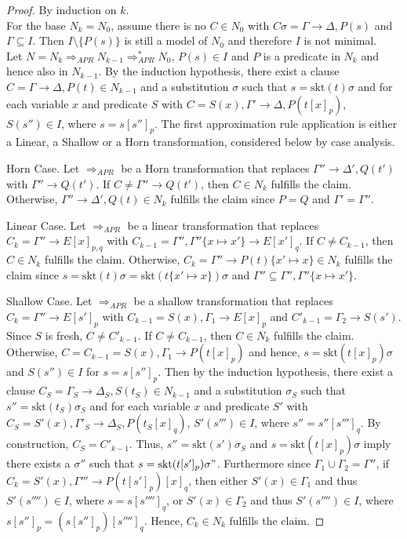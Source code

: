\documentclass{llncs}
\newcommand{\imp}{\rightarrow}
\newcommand{\skt}{\text{skt}}
\newcommand{\apr}{ \Rightarrow_{APR}}
\begin{document}
\begin{proof}
By induction on $k$.\\
For the base $N_k=N_0$, assume there is no $C \in N_0$ with $C\sigma= \Gamma \imp \Delta,P(s)$ and $\Gamma \subseteq I$.
Then $I\setminus \{P(s)\}$ is still a model of $N_0$ and therefore $I$ is not minimal.\\
Let  $N = N_k\apr N_{k-1} \apr^* N_0$, $P(s) \in  I$ and $P$ is a predicate in $N_k$ and hence also in $N_{k-1}$. 
By the induction hypothesis, there exist a clause $C = \Gamma \imp \Delta,P(t) \in N_{k-1}$ and a substitution $\sigma$ such that
$s = \skt(t)\sigma$ and for each variable $x$ and predicate $S$ with $C = S(x),\Gamma' \imp \Delta,P(t[x]_p)$, $S(s'') \in I$, where $s=s[s'']_p$.
The first approximation rule application is either a Linear, a Shallow or a Horn transformation,
considered below by case analysis.

Horn Case. Let $\apr$ be a Horn transformation that replaces $\Gamma'' \imp \Delta',Q(t')$ with $\Gamma'' \imp Q(t')$.
If $C \neq \Gamma'' \imp Q(t')$, then $C \in N_k$ fulfills the claim.
Otherwise, $\Gamma'' \imp \Delta',Q(t) \in N_k$ fulfills the claim since $P=Q$ and $\Gamma' = \Gamma''$.

Linear Case. Let $\apr$ be a linear transformation that replaces $C_k = \Gamma'' \imp E[x]_{p,q}$ with $C_{k-1}=\Gamma'',\Gamma''\{x \mapsto x'\} \imp E[x']_{q}$.
If $C \neq C_{k-1}$, then $C \in N_k$ fulfills the claim.
Otherwise, $C_k=\Gamma'' \imp P(t)\{x' \mapsto x\} \in N_k$ fulfills the claim since $s = \skt(t)\sigma = \skt(t\{x' \mapsto x\})\sigma$ and $\Gamma'' \subseteq \Gamma'',\Gamma''\{x \mapsto x'\}$.

Shallow Case. Let $\apr$ be a shallow transformation that replaces $C_k = \Gamma'' \imp E[s']_{p}$ with $C_{k-1}=S(x),\Gamma_1 \imp E[x]_p$ and $C'_{k-1}=\Gamma_2 \imp S(s')$.
Since $S$ is fresh, $C \neq C'_{k-1}$.
If $C \neq C_{k-1}$, then $C \in N_k$ fulfills the claim.
Otherwise, $C = C_{k-1} = S(x),\Gamma_1 \imp P(t[x]_p)$ and hence, $s = \skt(t[x]_p)\sigma$ and $S(s'')\in I$ for $s=s[s'']_p$.
Then by the induction hypothesis, there exist a clause $C_S = \Gamma_S \imp \Delta_S,S(t_S) \in N_{k-1}$ and a substitution $\sigma_S$ such that
$s'' = \skt(t_S)\sigma_S$ and for each variable $x$ and predicate $S'$ with $C_S = S'(x),\Gamma'_S \imp \Delta_S,P(t_S[x]_q)$, $S'(s''') \in I$, where $s''=s''[s''']_q$.
By construction, $C_S = C'_{k-1}$. 
Thus,  $s''= \skt(s')\sigma_S$ and $s = \skt(t[x]_p)\sigma$ imply there exists a $\sigma''$ such that $s =  \skt(t[s']_p)\sigma"$.
Furthermore since $\Gamma_1 \cup \Gamma_2 = \Gamma''$, if $C_k= S'(x),\Gamma''' \imp P(t[s']_{p})[x]_q$, then 
either $S'(x) \in \Gamma_1$ and thus  $S'(s'''') \in I$, where $s=s[s'''']_q$, or 
$S'(x) \in \Gamma_2$ and thus  $S'(s'''') \in I$, where $s[s'']_p=(s[s'']_p)[s'''']_q$.
Hence, $C_k \in N_k$  fulfills the claim.
\end{proof}
\end{document}
